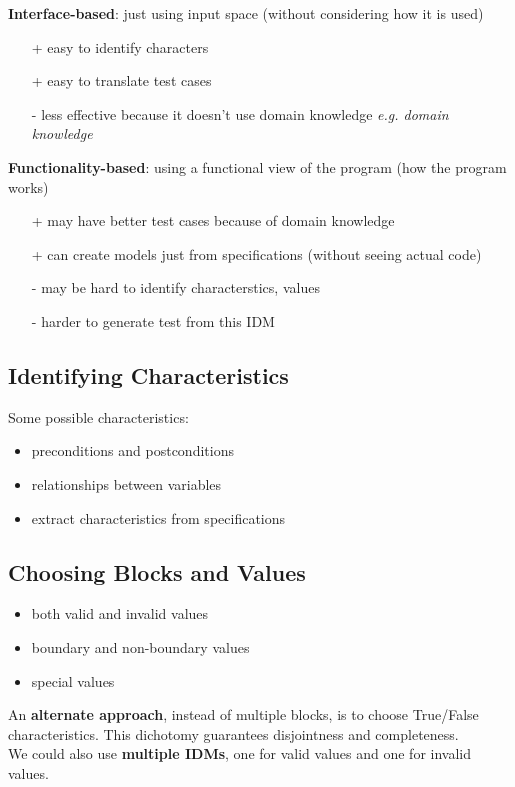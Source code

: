 \documentclass[]{article}
\theoremstyle{definition}
\begin{document}
		\textbf{Interface-based}: just using input space (without considering how it is used)
		\begin{itemize}
			\item[+] easy to identify characters
			\item[+] easy to translate test cases
			\item[-] less effective because it doesn't use domain knowledge \textit{e.g. domain knowledge}
		\end{itemize}

		\textbf{Functionality-based}: using a functional view of the program (how the program works)
		\begin{itemize}
			\item[+] may have better test cases because of domain knowledge
			\item[+] can create models just from specifications (without seeing actual code)
			\item[-] may be hard to identify characterstics, values
			\item[-] harder to generate test from this IDM
		\end{itemize}
		
		\subsection{Identifying Characteristics}
		Some possible characteristics:
		\begin{itemize}
			\item preconditions and postconditions
			\item relationships between variables 
			\item extract characteristics from specifications
		\end{itemize}

		\subsection{Choosing Blocks and Values}
		\begin{itemize}
			\item both valid and invalid values
			\item boundary and non-boundary values
			\item special values
		\end{itemize}
		An \textbf{alternate approach}, instead of multiple blocks, is to choose True/False characteristics.
		This dichotomy guarantees disjointness and completeness. \\
		We could also use \textbf{multiple IDMs}, one for valid values and one for invalid values.
\end{document}
